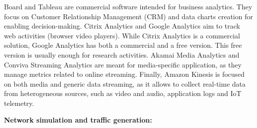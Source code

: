 Board \cite{Board} and Tableau \cite{Hoelscher2018} are commercial software intended for business analytics. They focus on Customer Relationship Management (CRM) and data charts creation for enabling decision-making.
Citrix Analytics \cite{Citrix} and Google Analytics \cite{Ledford2011} aim to track web activities (browser video players). While Citrix Analytics is a commercial solution, Google Analytics has both a commercial and a free version. This free version is usually enough for research activities.
Akamai Media Analytics \cite{Akamai} and Conviva Streaming Analytics \cite{Conviva} are meant for media-specific application, as they manage metrics related to online streaming.
Finally, Amazon Kinesis \cite{AmazonKinesis} is focused on both media and generic data streaming, as it allows to collect real-time data from heterogeneous sources, such as video and audio, application logs and IoT telemetry.

\textbf{Network simulation and traffic generation:}

